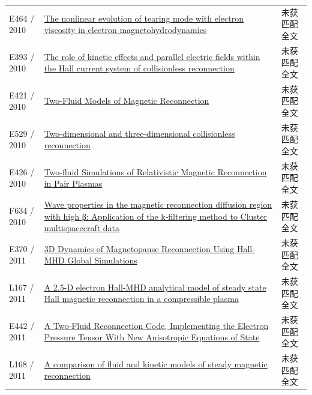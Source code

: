 \begin{longtable}{P{24mm}P{97mm}P{27mm}}
E464 / 2010 & \href{https://doi.org/10.1063/1.3328819}{The nonlinear evolution of tearing mode with electron viscosity in electron magnetohydrodynamics} & 未获匹配全文\\

E393 / 2010 & \href{https://ui.adsabs.harvard.edu/abs/2010APS..DPPCP9128E/abstract}{The role of kinetic effects and parallel electric fields within the Hall current system of collisionless reconnection} & 未获匹配全文\\

E421 / 2010 & \href{https://research.manchester.ac.uk/en/studentTheses/d99f1bda-cb55-47e2-8d82-ebe240e98456}{Two-Fluid Models of Magnetic Reconnection} & 未获匹配全文\\

E529 / 2010 & \href{http://edoc.mpg.de/472531}{Two-dimensional and three-dimensional collisionless reconnection} & 未获匹配全文\\

E426 / 2010 & \href{https://ui.adsabs.harvard.edu/abs/2010AAS...21545326Z/abstract}{Two-fluid Simulations of Relativistic Magnetic Reconnection in Pair Plasmas} & 未获匹配全文\\

F634 / 2010 & \href{https://doi.org/10.1029/2010ja015335}{Wave properties in the magnetic reconnection diffusion region with high β: Application of the k‐filtering method to Cluster multispacecraft data} & 未获匹配全文\\

E370 / 2011 & \href{http://ui.adsabs.harvard.edu/abs/2011AGUFMSM21A1983M/abstract}{3D Dynamics of Magnetopause Reconnection Using Hall-MHD Global Simulations} & 未获匹配全文\\

L167 / 2011 & \href{https://doi.org/10.1029/2010ja015942}{A 2.5-D electron Hall-MHD analytical model of steady state Hall magnetic reconnection in a compressible plasma} & 未获匹配全文\\

E442 / 2011 & \href{http://absimage.aps.org/image/DPP11/MWS_DPP11-2011-000787.pdf}{A Two-Fluid Reconnection Code,  Implementing the Electron Pressure Tensor With New Anisotropic Equations of State} & 未获匹配全文\\

L168 / 2011 & \href{https://doi.org/10.1063/1.3568828}{A comparison of fluid and kinetic models of steady magnetic reconnection} & 未获匹配全文\\


\end{longtable}

